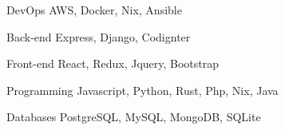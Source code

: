 

\begin{cvskills}

  \cvskill
    {DevOps} %
    {AWS, Docker, Nix, Ansible} %

  \cvskill
    {Back-end} %
    {Express, Django, Codignter } %

  \cvskill
    {Front-end} %
    {React, Redux, Jquery, Bootstrap} %

  \cvskill
    {Programming} %
    {Javascript, Python, Rust, Php, Nix, Java } %

	\cvskill
		{Databases} %
		{PostgreSQL, MySQL, MongoDB, SQLite} %
\end{cvskills}
